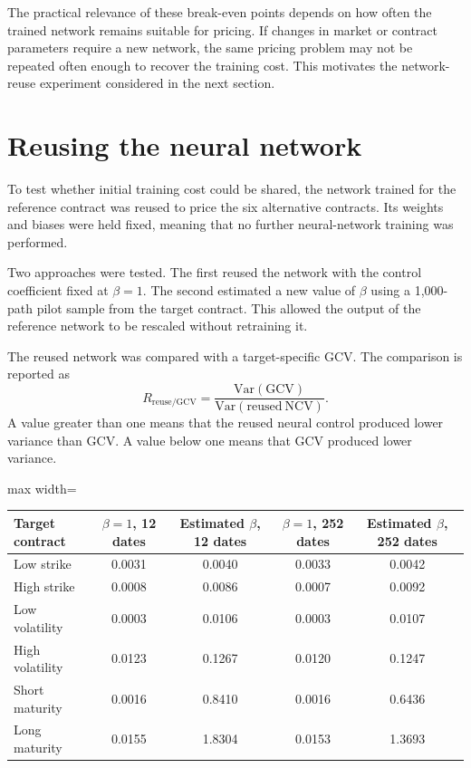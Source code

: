 The practical relevance of these break-even points depends on how often the trained network remains suitable for pricing. If changes in market or contract parameters require a new network, the same pricing problem may not be repeated often enough to recover the training cost. This motivates the network-reuse experiment considered in the next section.

\section{Reusing the neural network}

To test whether initial training cost could be shared, the network trained for the reference contract was reused to price the six alternative contracts. Its weights and biases were held fixed, meaning that no further neural-network training was performed.

Two approaches were tested. The first reused the network with the control coefficient fixed at $\beta=1$. The second estimated a new value of $\beta$ using a 1,000-path pilot sample from the target contract. This allowed the output of the reference network to be rescaled without retraining it.

The reused network was compared with a target-specific GCV. The comparison is reported as
\[
R_{\mathrm{reuse/GCV}}
=
\frac{\mathrm{Var}(\mathrm{GCV})}
{\mathrm{Var}(\mathrm{reused\ NCV})}.
\]
A value greater than one means that the reused neural control produced lower variance than GCV. A value below one means that GCV produced lower variance.

\begin{table}[h]
\centering
\begin{adjustbox}{max width=\textwidth}
\begin{tabular}{lcccc}
\hline
Target contract & $\beta=1$, 12 dates & Estimated $\beta$, 12 dates & $\beta=1$, 252 dates & Estimated $\beta$, 252 dates \\
\hline
Low strike & 0.0031 & 0.0040 & 0.0033 & 0.0042 \\
High strike & 0.0008 & 0.0086 & 0.0007 & 0.0092 \\
Low volatility & 0.0003 & 0.0106 & 0.0003 & 0.0107 \\
High volatility & 0.0123 & 0.1267 & 0.0120 & 0.1247 \\
Short maturity & 0.0016 & 0.8410 & 0.0016 & 0.6436 \\
Long maturity & 0.0155 & 1.8304 & 0.0153 & 1.3693 \\
\hline
\end{tabular}
\end{adjustbox}
\end{table}

